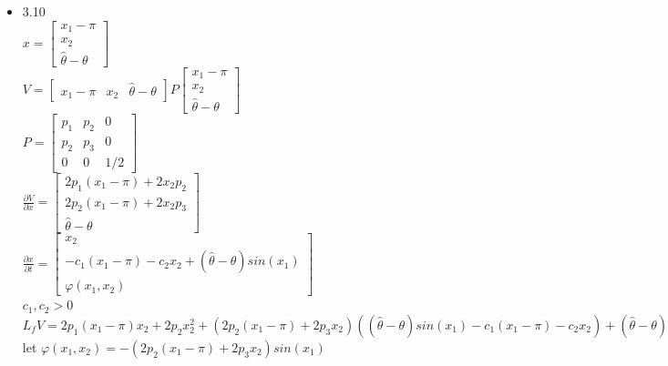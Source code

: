 \documentclass[12pt,letter]{article}
\begin{document}
\begin{itemize}
    \pagebreak
    
\item 3.10\\

  $x=\begin{bmatrix}
    x_1-\pi\\
    x_2\\
    \hat{\theta}-\theta
  \end{bmatrix}$\\

  $V=
  \begin{bmatrix}
    x_1-\pi & x_2 & \hat{\theta}-\theta
  \end{bmatrix}
  P
  \begin{bmatrix}
    x_1-\pi \\ x_2 \\ \hat{\theta}-\theta
  \end{bmatrix}$\\

  $P=\begin{bmatrix}
    p_1 & p_2 & 0\\
    p_2 & p_3 & 0\\
    0 & 0 & 1/2
  \end{bmatrix}$\\
  
  $\frac{\partial V}{\partial x} =
  \begin{bmatrix}
    2p_1(x_1-\pi)+2x_2p_2\\
    2p_2(x_1-\pi)+2x_2p_3\\
    \hat{\theta}-\theta
  \end{bmatrix}$\\

  $\frac{\partial x}{\partial t} =
  \begin{bmatrix}
    x_2\\
    -c_1(x_1-\pi)-c_2x_2+(\hat{\theta}-\theta)sin(x_1)\\
    \varphi(x_1,x_2)
  \end{bmatrix}$\\

  $c_1,c_2>0$\\
  
  $L_fV = 2p_1(x_1-\pi)x_2+2p_2x_2^2+(2p_2(x_1-\pi)+2p_3x_2)((\hat{\theta}-\theta)sin(x_1)-c_1(x_1-\pi)-c_2x_2) + (\hat{\theta}-\theta)\varphi(x_1,x_2)$\\

  let $\varphi(x_1,x_2)=-(2p_2(x_1-\pi)+2p_3x_2)sin(x_1)$\\


\end{itemize}
\end{document}
